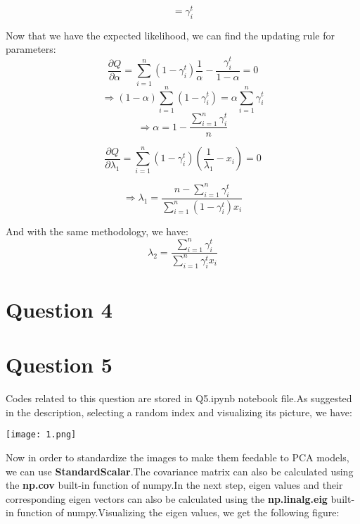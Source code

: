 \documentclass{article}
\begin{document}
\begin{equation*}
    = \gamma_i^t
\end{equation*}

Now that we have the expected likelihood, we can find the updating rule for parameters:
\begin{equation*}
    \frac{\partial Q}{\partial \alpha} = \sum_{i=1}^{n} (1-\gamma_i^t)\frac{1}{\alpha} - \frac{\gamma_i^t}{1-\alpha} = 0
\end{equation*}
\begin{equation*}
    \Rightarrow (1 - \alpha) \sum_{i=1}^{n}(1-\gamma_i^t) = \alpha \sum_{i=1}^{n} \gamma_i^t
\end{equation*}
\begin{equation*}
    \Rightarrow \alpha = 1 - \frac{\sum_{i=1}^{n} \gamma_i^t}{n}
\end{equation*}

\begin{equation*}
    \frac{\partial Q}{\partial \lambda_1} = \sum_{i=1}^{n}(1 - \gamma_i^t)(\frac{1}{\lambda_1} - x_i) = 0
\end{equation*}

\begin{equation*}
    \Rightarrow \lambda_1 = \frac{n - \sum_{i=1}^{n} \gamma_i^t}{\sum_{i=1}^{n}(1-\gamma_i^t)x_i}
\end{equation*}

And with the same methodology, we have:
\begin{equation*}
    \lambda_2 = \frac{\sum_{i=1}^{n} \gamma_i^t}{\sum_{i=1}^{n} \gamma_i^t x_i}
\end{equation*}


\section*{Question 4}

\section*{Question 5}
Codes related to this question are stored in Q5.ipynb notebook file.As suggested in the description, selecting a random index 
and visualizing its picture, we have:

\texttt{[image: 1.png]}

Now in order to standardize the images to make them feedable to PCA models, we can use \textbf{StandardScalar}.The covariance matrix can also be
calculated using the \textbf{np.cov} built-in function of numpy.In the next step, eigen values and their corresponding eigen vectors
can also be calculated using the \textbf{np.linalg.eig} built-in function of numpy.Visualizing the eigen values, we get the following figure:
\end{document}
